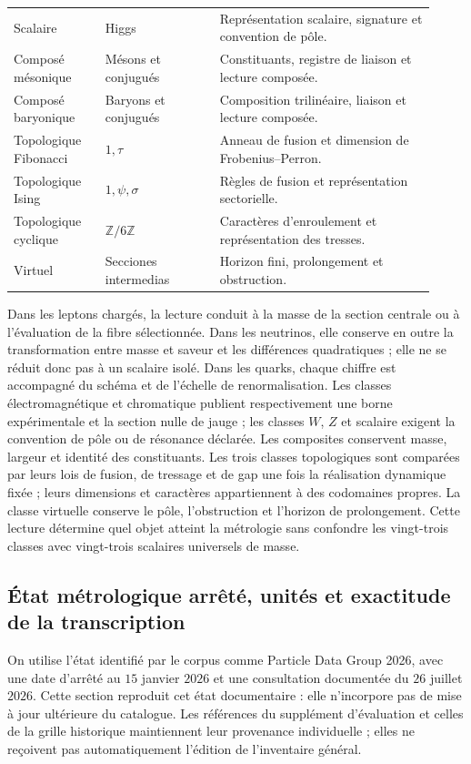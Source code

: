 \begin{longtable}{p{0.20\linewidth}p{0.25\linewidth}p{0.47\linewidth}}
Scalaire & Higgs
 & Représentation scalaire, signature et convention de pôle.\\
Composé mésonique & Mésons et conjugués & Constituants, registre de liaison et lecture composée.\\
Composé baryonique & Baryons et conjugués & Composition trilinéaire, liaison et lecture composée.\\
Topologique Fibonacci & \(1,\tau\) & Anneau de fusion et dimension de Frobenius--Perron.\\
Topologique Ising & \(1,\psi,\sigma\) & Règles de fusion et représentation sectorielle.\\
Topologique cyclique & \(\mathbb Z/6\mathbb Z\) & Caractères d’enroulement et représentation des tresses.\\
Virtuel & Secciones intermedias & Horizon fini, prolongement et obstruction.\\
\end{longtable}
\endgroup

Dans les leptons chargés, la lecture conduit à la masse de la section centrale
ou à l'évaluation de la fibre sélectionnée. Dans les neutrinos, elle conserve en outre
la transformation entre masse et saveur et les différences quadratiques ; elle
ne se réduit donc pas à un scalaire isolé. Dans les quarks, chaque chiffre est accompagné du
schéma et de l'échelle de renormalisation. Les classes électromagnétique et
chromatique publient respectivement une borne expérimentale et la section nulle
de jauge ; les classes \(W\), \(Z\) et scalaire exigent la convention de pôle
ou de résonance déclarée. Les composites conservent masse, largeur et identité
des constituants. Les trois classes topologiques sont comparées par leurs
lois de fusion, de tressage et de gap une fois la réalisation dynamique fixée ;
leurs dimensions et caractères appartiennent à des codomaines propres. La classe
virtuelle conserve le pôle, l'obstruction et l'horizon de prolongement. Cette
lecture détermine quel objet atteint la métrologie sans confondre les
vingt-trois classes avec vingt-trois scalaires universels de masse.

\subsection{État métrologique arrêté, unités et exactitude de la transcription}
\label{vi:subsec:vi-corte-metrologico}

On utilise l’état identifié par le corpus comme Particle Data Group
2026, avec une date d’arrêté au \(15\) janvier \(2026\) et une consultation
documentée du \(26\) juillet \(2026\). Cette section reproduit cet
état documentaire : elle n’incorpore pas de mise à jour ultérieure du catalogue.
Les références du supplément d’évaluation et celles de la grille historique
maintiennent leur provenance individuelle ; elles ne reçoivent pas automatiquement l’édition
de l’inventaire général.

